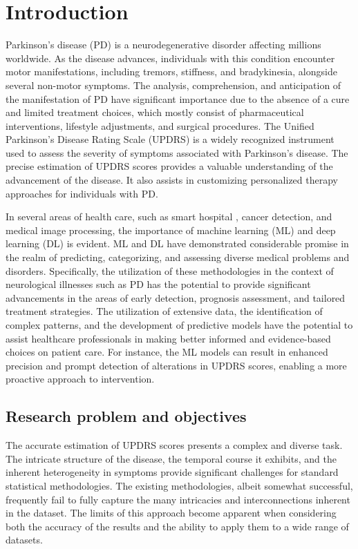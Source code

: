 \section{Introduction}
Parkinson's disease (PD) is a neurodegenerative disorder affecting millions worldwide\cite{1}. As the disease advances, individuals with this condition encounter motor manifestations, including tremors, stiffness, and bradykinesia, alongside several non-motor symptoms. The analysis, comprehension, and anticipation of the manifestation of PD have significant importance due to the absence of a cure\cite{2} and limited treatment choices, which mostly consist of pharmaceutical interventions, lifestyle adjustments, and surgical procedures. The Unified Parkinson's Disease Rating Scale (UPDRS) is a widely recognized instrument used to assess the severity of symptoms associated with Parkinson's disease. The precise estimation of UPDRS scores provides a valuable understanding of the advancement of the disease. It also assists in customizing personalized therapy approaches for individuals with PD. 

In several areas of health care, such as smart hospital \cite{3}, cancer detection\cite{4}, and medical image processing\cite{5}, the importance of machine learning (ML) and deep learning (DL) is evident. ML and DL have demonstrated considerable promise in the realm of predicting, categorizing, and assessing diverse medical problems and disorders. Specifically, the utilization of these methodologies in the context of neurological illnesses such as PD has the potential to provide significant advancements in the areas of early detection, prognosis assessment, and tailored treatment strategies. The utilization of extensive data, the identification of complex patterns, and the development of predictive models have the potential to assist healthcare professionals in making better informed and evidence-based choices on patient care. For instance, the ML models can result in enhanced precision and prompt detection of alterations in UPDRS scores, enabling a more proactive approach to intervention.





\subsection{Research problem and objectives}
The accurate estimation of UPDRS scores presents a complex and diverse task. The intricate structure of the disease, the temporal course it exhibits, and the inherent heterogeneity in symptoms provide significant challenges for standard statistical methodologies. The existing methodologies, albeit somewhat successful, frequently fail to fully capture the many intricacies and interconnections inherent in the dataset. The limits of this approach become apparent when considering both the accuracy of the results and the ability to apply them to a wide range of datasets.

